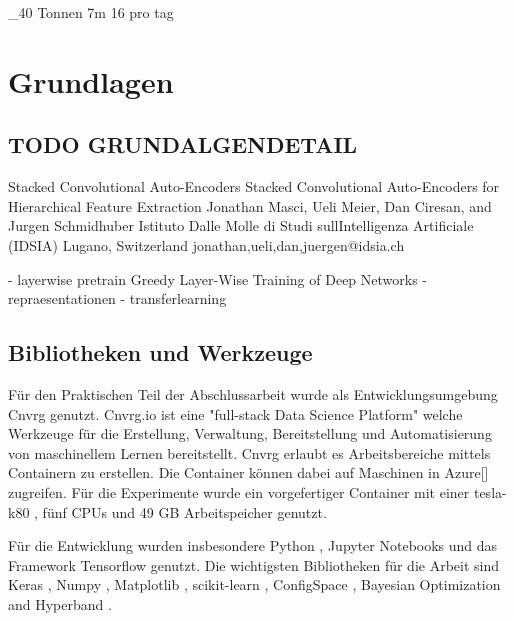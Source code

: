 \_40 Tonnen
7m
16 pro tag





\chapter{Grundlagen}
\label{chap:Grundlagen}

	\section{TODO GRUNDALGENDETAIL}
	\label{sec:TODOGrundlagenDetail}
		Stacked Convolutional Auto-Encoders Stacked Convolutional Auto-Encoders for
		Hierarchical Feature Extraction
		Jonathan Masci, Ueli Meier, Dan Ciresan, and Jurgen Schmidhuber
		Istituto Dalle Molle di Studi sullIntelligenza Artificiale (IDSIA)
		Lugano, Switzerland
		{jonathan,ueli,dan,juergen}@idsia.ch
		
 			- layerwise pretrain {Greedy Layer-Wise Training of Deep Networks}
		- repraesentationen
		- transferlearning
	\section{Bibliotheken und Werkzeuge}
	\label{sec:BibliothekenundWerkzeuge}
	Für den Praktischen Teil der Abschlussarbeit wurde als Entwicklungsumgebung Cnvrg \cite{cnvrg.io.} genutzt. Cnvrg.io ist eine "full-stack Data Science Platform" welche Werkzeuge für die Erstellung, Verwaltung, Bereitstellung und Automatisierung von maschinellem Lernen bereitstellt. Cnvrg erlaubt es Arbeitsbereiche mittels Containern zu erstellen. Die Container können dabei auf Maschinen in Azure[] zugreifen. Für die Experimente wurde ein vorgefertiger Container mit einer tesla-k80 \cite{Nvidia.2020}, fünf CPUs und 49 GB Arbeitspeicher genutzt. 

	Für die Entwicklung wurden insbesondere Python \cite{PythonSoftwareFoundation.2020}, Jupyter Notebooks \cite{ProjectJupyter} und das Framework Tensorflow \cite{MartinAbadi.2015}  genutzt. Die wichtigsten Bibliotheken für die Arbeit sind Keras \cite{Chollet.2015} , Numpy \cite{Oliphant.2006} , Matplotlib \cite{Hunter.2007} , scikit-learn \cite{Pedregosa.2011} , ConfigSpace \cite{Lindauer.8162019} , Bayesian Optimization and Hyperband \cite{StefanFalkner.2018} . 
	
